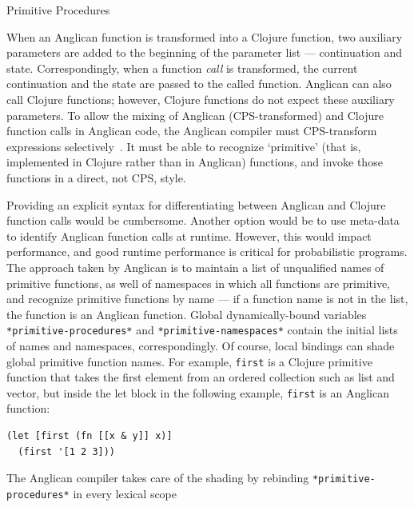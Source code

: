 \documentclass[preprint]{sigplanconf}
\begin{document}
\iftoggle{full}{%

}{%
}%

\iftoggle{full}{\subsubsection}{\subsection}{Primitive Procedures}
\label{seq:primitive}

When an Anglican function is transformed into a Clojure
function\iftoggle{full}{ by \texttt{fn-cps}}{}, two auxiliary
parameters are added to the beginning of the parameter list ---
continuation and state.  Correspondingly, when a function
\textit{call} is transformed\iftoggle{full}{ (by
\texttt{cps-of-application} or \texttt{cps-of-apply})}{}, the
current continuation and the state are passed to the called
function. Anglican can also call Clojure functions; however,
Clojure functions do not expect these auxiliary parameters.
To allow the mixing of Anglican (CPS-transformed) and Clojure
function calls in Anglican code, the Anglican compiler must CPS-transform
expressions selectively~\cite{Nielsen01}. It must be
able to recognize `primitive' (that is, implemented in Clojure
rather than in Anglican) functions, and invoke
those functions in a direct, not CPS, style. 

Providing an explicit syntax for differentiating between
Anglican and Clojure function calls would be cumbersome. Another
option would be to use meta-data to identify Anglican function
calls at runtime. However, this would impact performance, and
good runtime performance is critical for probabilistic
programs. The approach taken by Anglican is to maintain a list
of unqualified names of primitive functions, as well of
namespaces in which all functions are primitive, and recognize
primitive functions by name --- if a function name is not in the
list, the function is an Anglican function. Global dynamically-bound 
variables \texttt{*primitive-procedures*} and
\texttt{*primitive-namespaces*} contain the initial lists of
names and namespaces, correspondingly. Of course, local bindings
can shade global primitive function names. For example,
\texttt{first} is a Clojure primitive function that takes the first
element from an ordered collection such as list and vector,
but inside the let block in the
following example, \texttt{first} is an Anglican function:
\begin{lstlisting}[style=default]
(let [first (fn [[x & y]] x)]
  (first '[1 2 3]))
\end{lstlisting}
The Anglican compiler takes care of the shading by rebinding
\texttt{*primitive-procedures*} in every lexical
scope\iftoggle{full}{ (\texttt{fn-cps}, \texttt{cps-of-let}). Macro
\texttt{shading-primitive-procedures} automates the shading}{.}
\end{document}
